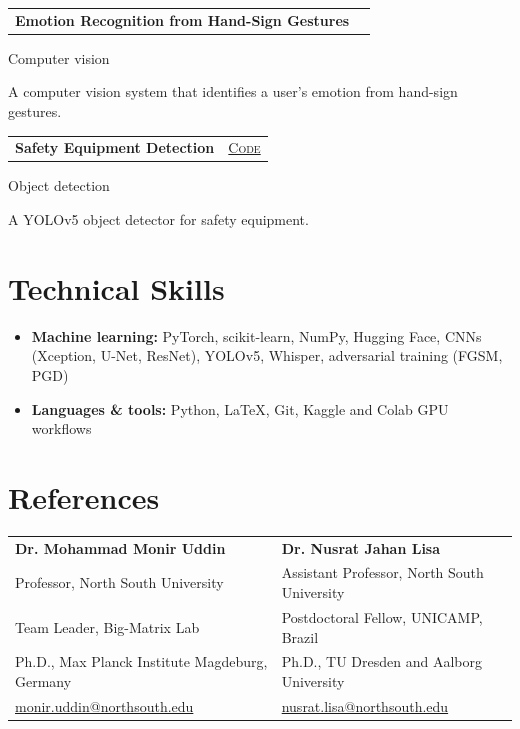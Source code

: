 \documentclass[a4paper,10pt]{article}
\makeatletter
\newcommand{\project}[4]{%
  \needspace{5\baselineskip}%
  \begin{tabularx}{\linewidth}{@{}X r@{}}
    \textbf{#1} & {\footnotesize\color{accent}\textsc{#2}} \\
  \end{tabularx}\par
  {\small\color{muted}#3}\par\vspace{1pt}
  {\small #4}\par\vspace{4pt}}
\newenvironment{tight}{\begin{itemize}[leftmargin=1.1em, itemsep=0pt, parsep=0pt, topsep=2pt, partopsep=0pt, label={\textbullet}]\small}{\end{itemize}}
\makeatother
\begin{document}
\project{Emotion Recognition from Hand-Sign Gestures}{}
{Computer vision}
{A computer vision system that identifies a user's emotion from hand-sign gestures.}

\project{Safety Equipment Detection}{\href{https://github.com/NinjaIfti/Safery-Equipment-Detection-}{Code}}
{Object detection}
{A YOLOv5 object detector for safety equipment.}

\section{Technical Skills}
\begin{tight}
  \item[] \textbf{Machine learning:} PyTorch, scikit-learn, NumPy, Hugging Face, CNNs (Xception, U-Net, ResNet), YOLOv5, Whisper, adversarial training (FGSM, PGD)
  \item[] \textbf{Languages \& tools:} Python, \LaTeX, Git, Kaggle and Colab GPU workflows
\end{tight}

\section{References}
\small
\begin{tabularx}{\linewidth}{@{}X X@{}}
  \textbf{Dr. Mohammad Monir Uddin} & \textbf{Dr. Nusrat Jahan Lisa} \\
  Professor, North South University & Assistant Professor, North South University \\
  Team Leader, Big-Matrix Lab & Postdoctoral Fellow, UNICAMP, Brazil \\
  Ph.D., Max Planck Institute Magdeburg, Germany & Ph.D., TU Dresden and Aalborg University \\
  \href{mailto:monir.uddin@northsouth.edu}{monir.uddin@northsouth.edu} & \href{mailto:nusrat.lisa@northsouth.edu}{nusrat.lisa@northsouth.edu} \\
\end{tabularx}
\end{document}
